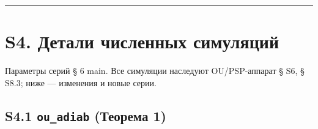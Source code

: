 \documentclass[12pt]{iopart}
\providecommand{\texorpdfstring}[2]{#1}
\begin{document}
\begin{center}\rule{0.5\linewidth}{0.5pt}\end{center}



\section{S4. Детали численных симуляций}\label{s4.-ux434ux435ux442ux430ux43bux438-ux447ux438ux441ux43bux435ux43dux43dux44bux445-ux441ux438ux43cux443ux43bux44fux446ux438ux439}



Параметры серий § 6 main. Все симуляции наследуют OU/PSP-аппарат \cite{Andriishin2026b} § S6, § S8.3; ниже --- изменения и новые серии.



\subsection{\texorpdfstring{S4.1 \texttt{ou\_adiab} (Теорема 1)}{S4.1 ou\_adiab (Теорема 1)}}\label{s4.1-ou_adiab-ux442ux435ux43eux440ux435ux43cux430-1}
\end{document}
